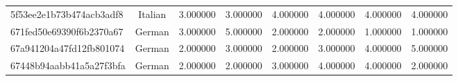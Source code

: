 \begin{table}[htbp]
\begin{tabular}{lccccccc}
5f53ee2e1b73b474acb3adf8 & Italian & 3.000000 & 3.000000 & 4.000000 & 4.000000 & 4.000000 & 4.000000 \\
671fed50e69390f6b2370a67 & German & 3.000000 & 5.000000 & 2.000000 & 2.000000 & 1.000000 & 1.000000 \\
67a941204a47fd12fb801074 & German & 2.000000 & 3.000000 & 2.000000 & 3.000000 & 4.000000 & 5.000000 \\
67448b94aabb41a5a27f3bfa & German & 2.000000 & 2.000000 & 3.000000 & 4.000000 & 4.000000 & 2.000000 \\
\bottomrule
\end{tabular}
\end{table}
